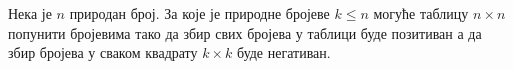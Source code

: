 \problem
Нека је $n$ природан број.
За које је природне бројеве $k \leq n$ могуће таблицу $n \times n$ попунити
бројевима тако да збир свих бројева у таблици буде позитиван а да збир бројева
у сваком квадрату $k \times k$ буде негативан.

\solution

\endproblem
